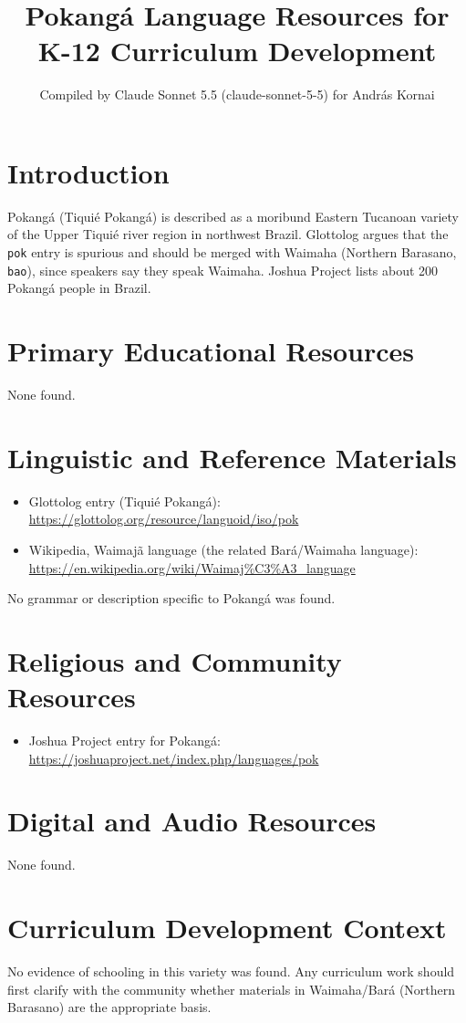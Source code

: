 \documentclass[12pt]{article}
\title{Pokang\'a Language Resources for K-12 Curriculum Development}
\author{Compiled by Claude Sonnet 5.5 (claude-sonnet-5-5) for Andr\'as Kornai}
\date{}
\begin{document}
\maketitle

\section{Introduction}
Pokang\'a (Tiquié Pokang\'a) is described as a moribund Eastern Tucanoan variety of the Upper Tiqui\'e river region in northwest Brazil. Glottolog argues that the \texttt{pok} entry is spurious and should be merged with Waimaha (Northern Barasano, \texttt{bao}), since speakers say they speak Waimaha. Joshua Project lists about 200 Pokang\'a people in Brazil.

\section{Primary Educational Resources}
None found.

\section{Linguistic and Reference Materials}
\begin{itemize}
\item Glottolog entry (Tiqui\'e Pokang\'a): \url{https://glottolog.org/resource/languoid/iso/pok}
\item Wikipedia, Waimaj\~a language (the related Bar\'a/Waimaha language): \url{https://en.wikipedia.org/wiki/Waimaj%C3%A3_language}
\end{itemize}
No grammar or description specific to Pokang\'a was found.

\section{Religious and Community Resources}
\begin{itemize}
\item Joshua Project entry for Pokang\'a: \url{https://joshuaproject.net/index.php/languages/pok}
\end{itemize}

\section{Digital and Audio Resources}
None found.

\section{Curriculum Development Context}
No evidence of schooling in this variety was found. Any curriculum work should first clarify with the community whether materials in Waimaha/Bar\'a (Northern Barasano) are the appropriate basis.
\end{document}
